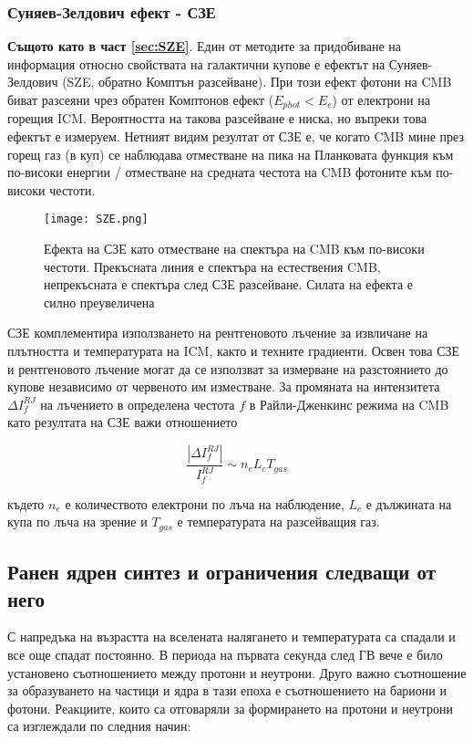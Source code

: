 \documentclass[a4paper,12pt]{article}
\begin{document}
\subsubsection{Суняев-Зелдович ефект - СЗЕ} 
\textbf{Същото като в част \ref{sec:SZE}}. Един от методите за придобиване на информация относно свойствата на галактични купове е ефектът на Суняев-Зелдович (SZE, обратно Комптън разсейване). При този ефект фотони на CMB биват разсеяни чрез обратен Комптонов ефект ($E_{phot}<E_{e}$) от електрони на горещия ICM. Вероятността на такова разсейване е ниска, но въпреки това ефектът е измеруем. Нетният видим резултат от СЗЕ е, че когато CMB мине през горещ газ (в куп) се наблюдава отместване на пика на Планковата функция към по-високи енергии / отместване на средната честота на CMB фотоните към по-високи честоти.


\begin{figure}[h!] %
\centering
\texttt{[image: SZE.png]}
\caption{Ефекта на СЗЕ като отместване на спектъра на CMB към по-високи честоти. Прекъсната линия е спектъра на естествения CMB, непрекъсната е спектъра след СЗЕ разсейване. Силата на ефекта е силно преувеличена}
\label{fig:SZE}
\end{figure}


СЗЕ комплементира използването на рентгеновото лъчение за извличане на плътността и температурата на ICM, както и техните градиенти. Освен това СЗЕ и рентгеновото лъчение могат да се използват за измерване на разстоянието до купове независимо от червеното им изместване. За промяната на интензитета $\Delta I_f^{RJ}$ на лъчението в определена честота $f$ в Райли-Дженкинс режима на CMB като резултата на СЗЕ важи отношението 

\begin{equation}
    \frac{|\Delta I_f^{RJ}|}{I_f^{RJ}} \sim n_e L_c T_{gas}
\end{equation}

където $n_e$ е количеството електрони по лъча на наблюдение, $L_c$ е дължината на купа по лъча на зрение и $T_{gas}$ е температурата на разсейващия газ.

\subsection{Ранен ядрен синтез и ограничения следващи от него}
С напредъка на възрастта на вселената налягането и температурата са спадали и все още спадат постоянно. В периода на първата секунда след ГВ вече е било установено съотношението между протони и неутрони. Друго важно съотношение за образуването на частици и ядра в тази епоха е съотношението на бариони и фотони. Реакциите, които са отговаряли за формирането на протони и неутрони са изглеждали по следния начин:
\end{document}
